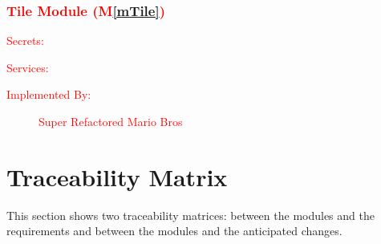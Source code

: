 \documentclass[12pt, titlepage]{article}
\newcommand{\mref}[1]{M\ref{#1}}
\begin{document}
\subsubsection{\textcolor{red}{Tile Module (\mref{mTile})}}

\begin{description}
\item[\textcolor{red}{Secrets:}] \textcolor{red}{}
\item[\textcolor{red}{Services:}] \textcolor{red}{}
\item[\textcolor{red}{Implemented By:}] \textcolor{red}{Super Refactored Mario Bros}
\end{description}

\section{Traceability Matrix} \label{SecTM}

This section shows two traceability matrices: between the modules and the
requirements and between the modules and the anticipated changes.
\end{document}
